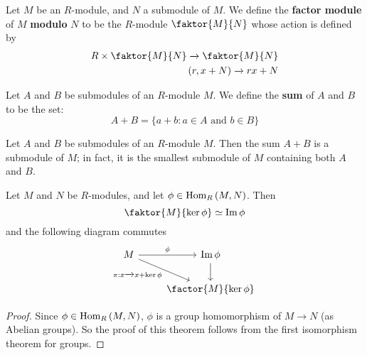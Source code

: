 \begin{definition}
  Let $M$ be an  $R$-module, and  $N$ a submodule of  $M$. We define
  the  \textbf{factor module} of $M$  \textbf{modulo} $N$ to be the
   $R$-module  $\faktor{M}{N}$ whose action is defined by
   \begin{equation}
     \begin{aligned}
       R \times \faktor{M}{N} \xrightarrow{} \faktor{M}{N}  \\
       (r,x+N)  \xrightarrow{} rx+N \\
     \end{aligned}
   \end{equation}
\end{definition}

\begin{definition}
  Let $A$ and  $B$ be submodules of an  $R$-module  $M$. We define the
   \textbf{sum} of $A$ and $B$ to be the set:
   \begin{equation*}
     A+B=\{ a+b : a \in A \text{ and } b \in B \}
   \end{equation*}
\end{definition}

\begin{lemma}\label{lemma_4.3.2}
  Let $A$ and  $B$ be submodules of an  $R$-module  $M$. Then the sum
  $A+B$ is a submodule of $M$; in fact, it is the smallest submodule
  of  $M$ containing both  $A$ and  $B$.
\end{lemma}

\begin{theorem}\label{theorem_4.3.3}
  Let $M$ and  $N$ be  $R$-modules, and let  $\phi \in \operatorname{Hom}_R{(M,N)}$.
  Then
  \begin{equation*}
    \faktor{M}{\ker{\phi}} \simeq \im{\phi}
  \end{equation*}
  and the following diagram commutes
  \[\begin{tikzcd}
    M & {\im{\phi}} \\
      & {\factor{M}{\ker{\phi}}}
      \arrow["\phi", from=1-1, to=1-2]
      \arrow["{\pi:x \xrightarrow{} x+\ker{\phi}}"', from=1-1, to=2-2]
      \arrow[from=1-2, to=2-2]
  \end{tikzcd}\]
\end{theorem}
\begin{proof}
  Since $\phi \in \operatorname{Hom}_R{(M,N)}$, $\phi$ is a group homomorphism of
  $M \xrightarrow{} N$ (as Abelian groups). So the proof of this
  theorem follows from the first isomorphism theorem for groups.
\end{proof}

